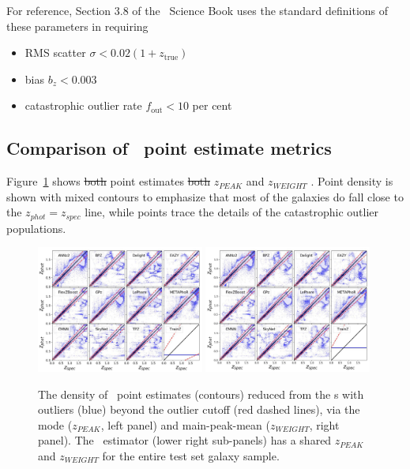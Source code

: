 For reference, Section 3.8 of the \lsst\ Science Book \citep{Abell:09} uses the standard definitions of these parameters in requiring
\begin{itemize}
\item RMS scatter $\sigma < 0.02 (1 + z_{\mathrm{true}})$
\item bias $b_{z} < 0.003$ 
\item catastrophic outlier rate $f_{\mathrm{out}} < 10$ per cent 
\end{itemize}

\subsection{Comparison of \pz\ point estimate metrics}
\label{sec:pointmetrics_results}

Figure~\ref{fig:pz_pointestimates} shows \sout{both} point estimates \sout{both} $z_{PEAK}$ and $z_{WEIGHT}$ .
Point density is shown with mixed contours to emphasize that most of the galaxies do fall close to the $z_{phot} = z_{spec}$ line, while points trace the details of the catastrophic outlier populations.

\begin{figure}
\centering
\includegraphics[width=0.49\textwidth]{fig/ZPEAK_szpz_threecolumn_12codes_biglabels_crop.jpg}
\includegraphics[width=0.49\textwidth]{fig/ZWEIGHT_szpz_threecolumn_12codes_biglabels_crop.jpg}
\caption{The density of \pz\ point estimates (contours) reduced from the \pzpdf s with outliers (blue) beyond the outlier cutoff (red dashed lines), via the mode ($z_{PEAK}$, left panel) and main-peak-mean ($z_{WEIGHT}$, right panel).
The \trainz\ estimator (lower right sub-panels) has a shared $z_{PEAK}$ and $z_{WEIGHT}$ for the entire test set galaxy sample.}
\label{fig:pz_pointestimates}
\end{figure}

